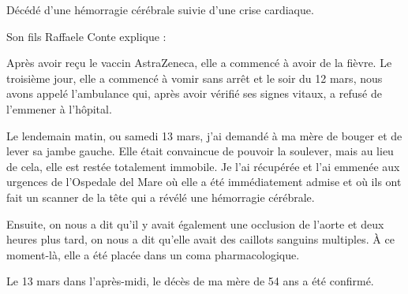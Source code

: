 Décédé d'une hémorragie cérébrale suivie d'une crise cardiaque.

Son fils Raffaele Conte explique :

Après avoir reçu le vaccin AstraZeneca, elle a commencé à avoir de la fièvre. Le
troisième jour, elle a commencé à vomir sans arrêt et le soir du 12 mars, nous
avons appelé l'ambulance qui, après avoir vérifié ses signes vitaux, a refusé de
l'emmener à l'hôpital.

Le lendemain matin, ou samedi 13 mars, j'ai demandé à ma mère de bouger et de
lever sa jambe gauche. Elle était convaincue de pouvoir la soulever, mais au
lieu de cela, elle est restée totalement immobile. Je l'ai récupérée et l'ai
emmenée aux urgences de l'Ospedale del Mare où elle a été immédiatement admise
et où ils ont fait un scanner de la tête qui a révélé une hémorragie cérébrale.

Ensuite, on nous a dit qu'il y avait également une occlusion de l'aorte et deux
heures plus tard, on nous a dit qu'elle avait des caillots sanguins multiples. À
ce moment-là, elle a été placée dans un coma pharmacologique.

Le 13 mars dans l'après-midi, le décès de ma mère de 54 ans a été confirmé.

